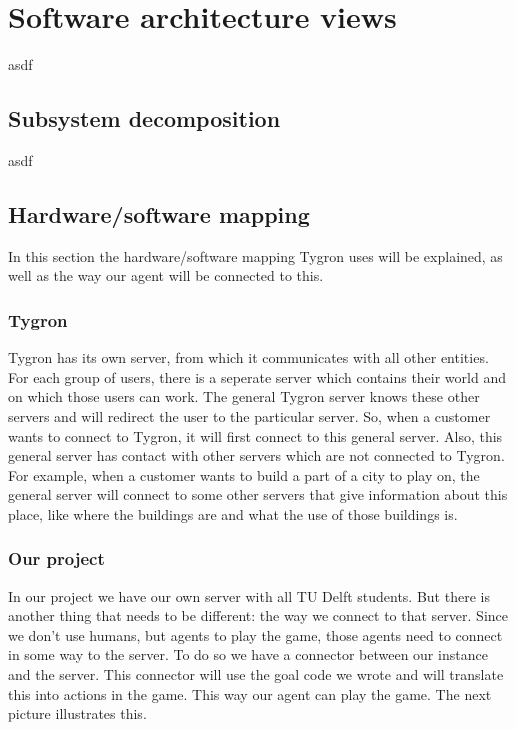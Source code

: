 \section{Software architecture views}
asdf
\subsection{Subsystem decomposition}
asdf
\newpage
\subsection{Hardware/software mapping}
In this section the hardware/software mapping Tygron uses will be explained, as well as the way our agent will be connected to this.

\subsubsection{Tygron}
Tygron has its own server, from which it communicates with all other entities. For each group of users, there is a seperate server which contains their world and on which those users can work. The general Tygron server knows these other servers and will redirect the user to the particular server. So, when a customer wants to connect to Tygron, it will first connect to this general server. Also, this general server has contact with other servers which are not connected to Tygron. For example, when a customer wants to build a part of a city to play on, the general server will connect to some other servers that give information about this place, like where the buildings are and what the use of those buildings is. 

\subsubsection{Our project}
In our project we have our own server with all TU Delft students. But there is another thing that needs to be different: the way we connect to that server. Since we don't use humans, but agents to play the game, those agents need to connect in some way to the server. To do so we have a connector between our instance and the server. This connector will use the goal code we wrote and will translate this into actions in the game. This way our agent can play the game. The next picture illustrates this.

